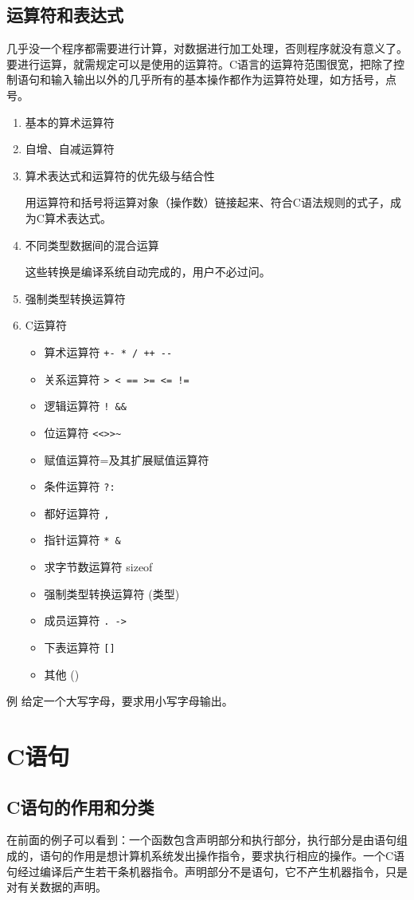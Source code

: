 \subsection{运算符和表达式}
几乎没一个程序都需要进行计算，对数据进行加工处理，否则程序就没有意义了。要进行运算，就需规定可以是使用的运算符。C语言的运算符范围很宽，把除了控制语句和输入输出以外的几乎所有的基本操作都作为运算符处理，如方括号，点号。
\begin{enumerate}
	\item 基本的算术运算符
	\item 自增、自减运算符
	\item 算术表达式和运算符的优先级与结合性

		用运算符和括号将运算对象（操作数）链接起来、符合C语法规则的式子，成为C算术表达式。
	\item 不同类型数据间的混合运算

		这些转换是编译系统自动完成的，用户不必过问。
	\item 强制类型转换运算符
	\item C运算符

		\begin{itemize}
			\item 算术运算符	\verb|+- * / ++ --|
			\item 关系运算符	\verb|> < == >= <= !=|
			\item 逻辑运算符 	\verb|! && |
			\item 位运算符		\verb|<<>>~ |
			\item 赋值运算符=及其扩展赋值运算符
			\item 条件运算符	\verb|?:|
			\item 都好运算符	\verb|,|
			\item 指针运算符	\verb|* &|
			\item 求字节数运算符	sizeof
			\item 强制类型转换运算符	(类型)
			\item 成员运算符	\verb|. ->|
			\item 下表运算符	\verb|[]|
			\item 其他  ()
		\end{itemize}
\end{enumerate}

例 给定一个大写字母，要求用小写字母输出。


\section{C语句}
\subsection{C语句的作用和分类}
在前面的例子可以看到：一个函数包含声明部分和执行部分，执行部分是由语句组成的，语句的作用是想计算机系统发出操作指令，要求执行相应的操作。一个C语句经过编译后产生若干条机器指令。声明部分不是语句，它不产生机器指令，只是对有关数据的声明。

